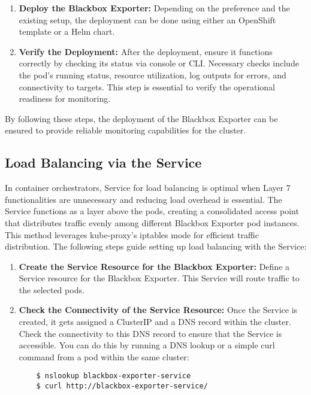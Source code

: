 \begin{enumerate}
    \item \textbf{Deploy the Blackbox Exporter:}
    Depending on the preference and the existing setup, the deployment can be done using either an OpenShift template or a Helm chart. 
    \item \textbf{Verify the Deployment:}
    After the deployment, ensure it functions correctly by checking its status via console or \ac{CLI}. Necessary checks include the pod's running status, resource utilization, log outputs for errors, and connectivity to targets. This step is essential to verify the operational readiness for monitoring. 
\end{enumerate}

By following these steps, the deployment of the Blackbox Exporter can be ensured to provide reliable monitoring capabilities for the cluster.

\subsection{Load Balancing via the Service}

In container orchestrators, Service for load balancing is optimal when Layer 7 functionalities are unnecessary and reducing load overhead is essential. The Service functions as a layer above the pods, creating a consolidated access point that distributes traffic evenly among different Blackbox Exporter pod instances. This method leverages kube-proxy's iptables mode for efficient traffic distribution. The following steps guide setting up load balancing with the Service: 

\begin{enumerate}
    \item \textbf{Create the Service Resource for the Blackbox Exporter:}
    Define a Service resource for the Blackbox Exporter. This Service will route traffic to the selected pods. 
    \item \textbf{Check the Connectivity of the Service Resource:}
    Once the Service is created, it gets assigned a ClusterIP and a DNS record within the cluster. Check the connectivity to this DNS record to ensure that the Service is accessible. You can do this by running a DNS lookup or a simple curl command from a pod within the same cluster: 
    \begin{verbatim}
    $ nslookup blackbox-exporter-service
    $ curl http://blackbox-exporter-service/
    \end{verbatim}
\end{enumerate}

